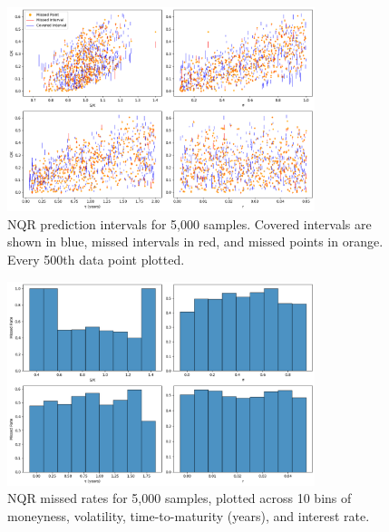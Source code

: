 \documentclass{article}
\theoremstyle{definition}
\begin{document}

\begin{figure}
    \centering
    \includegraphics[width=0.8\textwidth]{reports/figures/3.3-nm-figures/sample_0/NQR_PIs_0.png}
    \caption{NQR prediction intervals for 5,000 samples. Covered intervals are shown in blue, missed intervals in red, and missed points in orange. Every 500th data point plotted.}
    \label{fig:NQR_PIs_0}
\end{figure}

\begin{figure}
    \centering
    \includegraphics[width=0.8\textwidth]{reports/figures/3.3-nm-figures/sample_0/NQR_MISSED_RATE_0.png}
    \caption{NQR missed rates for 5,000 samples, plotted across 10 bins of moneyness, volatility, time-to-maturity (years), and interest rate.}
    \label{fig:NQR_MISSED_RATE_0}
\end{figure}
\end{document}
